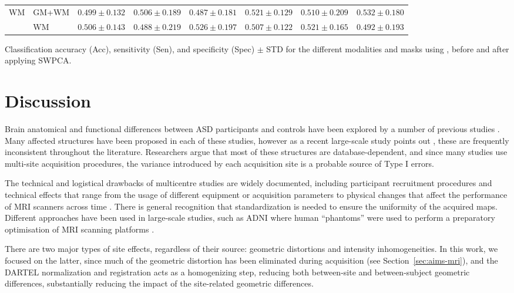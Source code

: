 \begin{bigtable}
\begin{tabularx}{\linewidth}{ll|XXX|XXX}
		\midrule
		\multirow{2}{*}{\ac{WM}} &GM+WM &
		$ 0.499 \pm 0.132 $ & $ 0.506 \pm 0.189 $ & $ 0.487 \pm 0.181 $ & $ 0.521 \pm 0.129 $ & $ 0.510 \pm 0.209 $ &  $ 0.532 \pm 0.180 $ \\
		&
		WM &
		$ 0.506 \pm 0.143 $ & $ 0.488 \pm 0.219 $ & $ 0.526 \pm 0.197 $ & $ 0.507 \pm 0.122 $ & $ 0.521 \pm 0.165 $ &   $ 0.492 \pm 0.193 $ \\
		\bottomrule
	\end{tabularx}
	\caption[Classification accuracy (Acc), sensitivity (Sen), and specificity (Spec) $\pm$ STD for the different modalities and masks using \all{}, before and after applying \acs{SWPCA}.]{Classification accuracy (Acc), sensitivity (Sen), and specificity (Spec) $\pm$ STD for the different modalities and masks using \all{}, before and after applying \ac{SWPCA}.}
	\label{tab:swpcaALL}
\end{bigtable}

\section{Discussion}
Brain anatomical and functional differences between \ac{ASD} participants and controls have been explored by a number of previous studies \cite{DiMartino2014,Ecker2015,Hernandez2015,Lenroot2013,Zuercher2015}. Many affected structures have been proposed in each of these studies, however as a recent large-scale study points out \cite{haar2014anatomical}, these are frequently inconsistent throughout the literature. Researchers argue that most of these structures are database-dependent, and since many studies use multi-site acquisition procedures, the variance introduced by each acquisition site is a probable source of Type I errors. 

The technical and logistical drawbacks of multicentre studies are widely documented, including participant recruitment procedures \cite{Pearlson2009} and technical effects that range from the usage of different equipment or acquisition parameters \cite{VanHorn2009} to physical changes that affect the performance of \ac{MRI} scanners across time \cite{Pearlson2009}. There is general recognition that standardization is needed to ensure the uniformity of the acquired maps. Different approaches have been used in large-scale studies, such as \ac{ADNI} where human ``phantoms'' were used to perform a preparatory optimisation of \ac{MRI} scanning platforms \cite{friedman2006report}. 

There are two major types of site effects, regardless of their source: geometric distortions and intensity inhomogeneities. In this work, we focused on the latter, since much of the geometric distortion has been eliminated during acquisition (see Section~\ref{sec:aims-mri}), and the DARTEL normalization and registration acts as a homogenizing step, reducing both between-site and between-subject geometric differences, substantially reducing the impact of the site-related geometric differences. 

